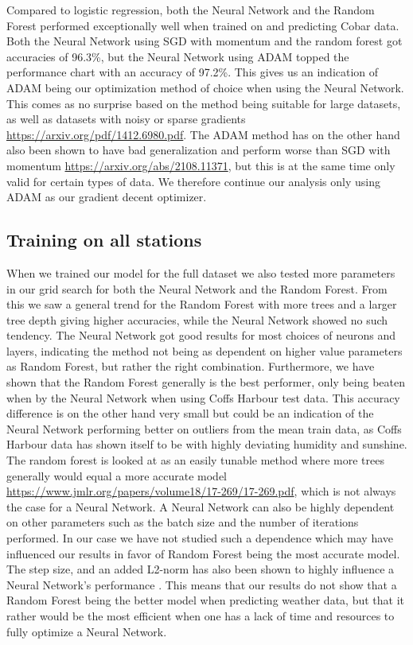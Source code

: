\documentclass[11pt]{article}
\begin{document}
Compared to logistic regression, both the Neural Network and the Random Forest performed exceptionally well when trained on and predicting Cobar data. Both the Neural Network using SGD with momentum and the random forest got accuracies of 96.3\%, but the Neural Network using ADAM topped the performance chart with an accuracy of 97.2\%. This gives us an indication of ADAM being our optimization method of choice when using the Neural Network. This comes as no surprise based on the method being suitable for large datasets, as well as datasets with noisy or sparse gradients \url{https://arxiv.org/pdf/1412.6980.pdf}. The ADAM method has on the other hand also been shown to have bad generalization and perform worse than SGD with momentum \url{https://arxiv.org/abs/2108.11371}, but this is at the same time only valid for certain types of data. We therefore continue our analysis only using ADAM as our gradient decent optimizer.

\subsection{Training on all stations} %
\label{sub:Training on all stations}

When we trained our model for the full dataset we also tested more parameters in our grid search for both the Neural Network and the Random Forest. From this we saw a general trend for the Random Forest with more trees and a larger tree depth giving higher accuracies, while the Neural Network showed no such tendency. The Neural Network got good results for most choices of neurons and layers, indicating the method not being as dependent on higher value parameters as Random Forest, but rather the right combination. Furthermore, we have shown that the Random Forest generally is the best performer, only being beaten when by the Neural Network when using Coffs Harbour test data. This accuracy difference is on the other hand very small but could be an indication of the Neural Network performing better on outliers from the mean train data, as Coffs Harbour data has shown itself to be with highly deviating humidity and sunshine. The random forest is looked at as an easily tunable method where more trees generally would equal a more accurate model \url{https://www.jmlr.org/papers/volume18/17-269/17-269.pdf}, which is not always the case for a Neural Network. A Neural Network can also be highly dependent on other parameters such as the batch size and the number of iterations performed. In our case we have not studied such a dependence which may have influenced our results in favor of Random Forest being the most accurate model. The step size, and an added L2-norm has also been shown to highly influence a Neural Network's performance \cite{project2}. This means that our results do not show that a Random Forest being the better model when predicting weather data, but that it rather would be the most efficient when one has a lack of time and resources to fully optimize a Neural Network.
\end{document}
